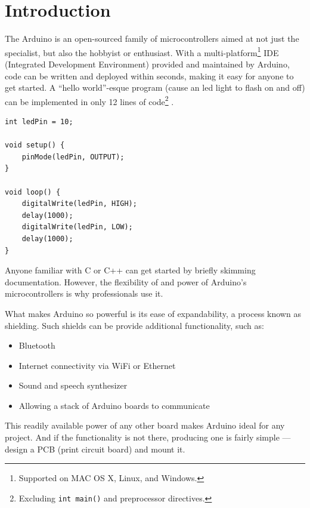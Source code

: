 \documentclass[11pt,letterpaper,twocolumn]{article}
\begin{document}

\section{Introduction}
The Arduino is an open-sourced family of microcontrollers aimed at not just the specialist, but also the hobbyist or enthusiast. With a multi-platform\footnote{Supported on MAC OS X, Linux, and Windows.} IDE (Integrated Development Environment) provided and maintained by Arduino, code can be written and deployed within seconds, making it easy for anyone to get started. A ``hello world''-esque program (cause an led light to flash on and off) can be implemented in only 12 lines of code\footnote{Excluding \texttt{int main()} and preprocessor directives.} \cite{book}.

\begin{verbatim}
int ledPin = 10;

void setup() {
    pinMode(ledPin, OUTPUT);
}

void loop() {
    digitalWrite(ledPin, HIGH);
    delay(1000);
    digitalWrite(ledPin, LOW);
    delay(1000);
}
\end{verbatim}

\noindent Anyone familiar with C or C++ can get started by briefly skimming documentation. However, the flexibility of and power of Arduino's microcontrollers is why professionals use it.

What makes Arduino so powerful is its ease of expandability, a process known as shielding. Such shields can be provide additional functionality, such as: \cite{shields}

\begin{itemize}
    \item Bluetooth
    \item Internet connectivity via WiFi or Ethernet
    \item Sound and speech synthesizer
    \item Allowing a stack of Arduino boards to communicate
\end{itemize}

\noindent This readily available power of any other board makes Arduino ideal for any project. And if the functionality is not there, producing one is fairly simple --- design a PCB (print circuit board) and mount it.
\end{document}
